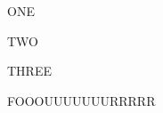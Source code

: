 \documentclass{article}
\begin{document}
\begin{itemize*}[itemjoin*={ és }]
\item ONE
\item TWO
\item THREE
\item FOOOUUUUUUURRRRR
\end{itemize*}
\end{document}
